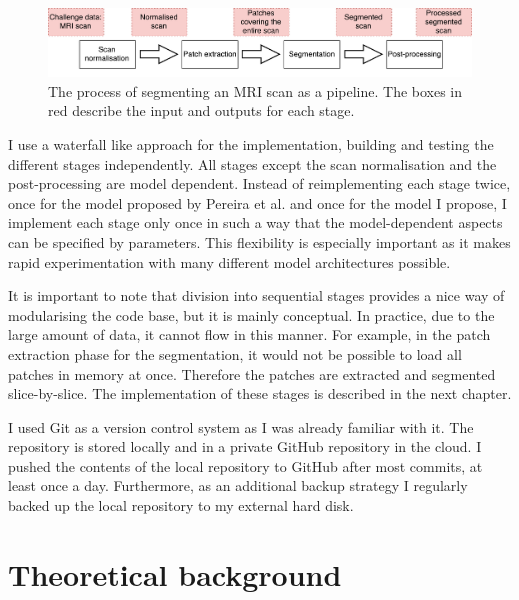 \documentclass[12pt,a4paper,twoside,openright]{report}
\begin{document}
\begin{figure}
	\centering
	\includegraphics[width=\textwidth]{segmentation_implementation_pipeline}
	\caption[The process of segmenting an MRI scan as a pipeline.]{The process of segmenting an MRI scan as a pipeline. The boxes in red describe the input and outputs for each stage.}
	\label{fig:segmentation_implementation_pipeline}
\end{figure}

I use a waterfall like approach for the implementation, building and testing the different stages independently. All stages except the scan normalisation and the post-processing are model dependent. Instead of reimplementing each stage twice, once for the model proposed by Pereira et al. and once for the model I propose, I implement each stage only once in such a way that the model-dependent aspects can be specified by parameters. This flexibility is especially important as it makes rapid experimentation with many different model architectures possible.

It is important to note that division into sequential stages provides a nice way of modularising the code base, but it is mainly conceptual. In practice, due to the large amount of data, it cannot flow in this manner. For example, in the patch extraction phase for the segmentation, it would not be possible to load all patches in memory at once. Therefore the patches are extracted and segmented slice-by-slice. The implementation of these stages is described in the next chapter.

I used Git as a version control system as I was already familiar with it. The repository is stored locally and in a private GitHub repository in the cloud. I pushed the contents of the local repository to GitHub after most commits, at least once a day. Furthermore, as an additional backup strategy I regularly backed up the local repository to my external hard disk.

\section{Theoretical background}
\end{document}
